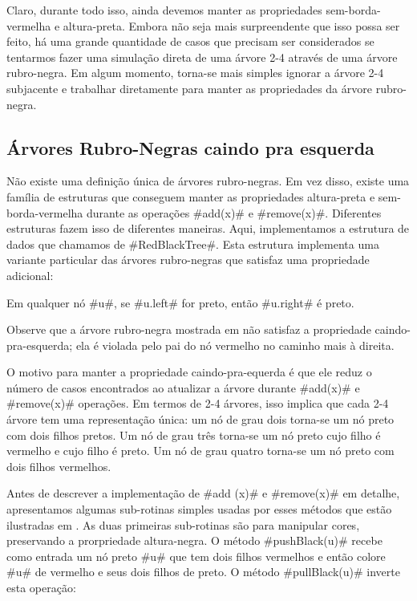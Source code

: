 Claro, durante todo isso, ainda devemos manter as propriedades sem-borda-vermelha
e altura-preta. Embora não seja mais surpreendente que isso possa ser feito,
há uma grande quantidade de casos que precisam ser considerados se tentarmos 
fazer uma simulação direta de uma árvore 2-4 através de uma
árvore rubro-negra. Em algum momento, torna-se mais simples ignorar a
árvore 2-4 subjacente e trabalhar diretamente para manter as propriedades
da árvore rubro-negra.

\subsection{Árvores Rubro-Negras caindo pra esquerda}

%
%
Não existe uma definição única de árvores rubro-negras. Em vez disso, existe
uma família de estruturas que conseguem manter as propriedades altura-preta
e sem-borda-vermelha durante as operações #add(x)# e #remove(x)#. 
Diferentes estruturas fazem isso de diferentes maneiras.
Aqui, implementamos a estrutura de dados que chamamos de #RedBlackTree#.
%
Esta estrutura implementa uma variante particular das árvores rubro-negras que
satisfaz uma propriedade adicional:
\begin{prp}
	Em qualquer nó #u#, se #u.left# for preto, então #u.right# é preto.
\end{prp}
Observe que a árvore rubro-negra mostrada em  não
satisfaz a propriedade caindo-pra-esquerda; ela é violada pelo pai do
nó vermelho no caminho mais à direita.

O motivo para manter a propriedade caindo-pra-equerda é que ele reduz
o número de casos encontrados ao atualizar a árvore durante #add(x)#
e #remove(x)# operações. Em termos de 2-4 árvores, isso implica que cada
2-4 árvore tem uma representação única: um nó de grau dois torna-se
um nó preto com dois filhos pretos. Um nó de grau três torna-se
um nó preto cujo filho é vermelho e cujo filho é preto.
Um nó de grau quatro torna-se um nó preto com dois filhos vermelhos.

Antes de descrever a implementação de #add (x)# e #remove(x)# em
detalhe, apresentamos algumas sub-rotinas simples usadas por esses métodos
que estão ilustradas em . As duas primeiras
sub-rotinas são para manipular cores, preservando a prorpriedade altura-negra.
O método #pushBlack(u)# recebe como entrada um nó preto #u#
que tem dois filhos vermelhos e então colore #u# de vermelho e seus dois filhos 
de preto. O método #pullBlack(u)# inverte esta operação:

